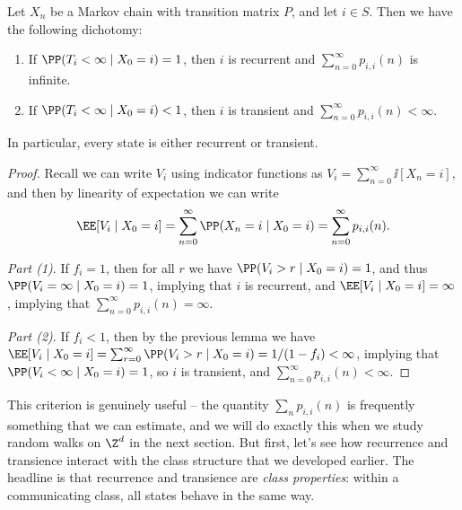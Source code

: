 \documentclass[a4paper]{scrartcl}
\begin{document}
\begin{theorem}
	Let $X_n$ be a Markov chain with transition matrix $P$, and let $i \in S$. Then we have the following dichotomy:
	\begin{enumerate}[label=(\arabic*)]
		\item If $\PP(T_i< \infty \mid X_0 = i) = 1$, then $i$ is recurrent and $\sum_{n = 0}^{\infty} p_{i, i}(n)$ is infinite.
		\item If $\PP(T_i < \infty \mid X_0 = i) < 1$, then $i$ is transient and $\sum_{n = 0}^{\infty} p_{i, i}(n) < \infty$.
	\end{enumerate}
	In particular, every state is either recurrent or transient.
\end{theorem}
\begin{proof}
	Recall we can write $V_i$ using indicator functions as
	$
	V_i = \sum_{n = 0}^{\infty} \ii[X_n = i],
	$
	and then by linearity of expectation we can write
	$$
	\EE[V_i \mid X_0 = i] = \sum_{n = 0}^{\infty} \PP(X_n = i \mid X_0 = i) = \sum_{n = 0}^{\infty} p_{i, i}(n).
	$$

	\emph{Part (1)}. If $f_i = 1$, then for all $r$ we have $\PP(V_i > r \mid X_0 = i) = 1$, and thus $\PP(V_i = \infty \mid X_0 = i) = 1$, implying that $i$ is recurrent, and $\EE[V_i \mid X_0 = i] = \infty$, implying that $\sum_{n = 0}^{\infty} p_{i, i}(n) = \infty$.

	\emph{Part (2)}. If $f_i < 1$, then by the previous lemma we have $\EE[V_i \mid X_0 = i] = \sum_{r = 0}^{\infty} \PP(V_i > r \mid X_0 = i) = 1/(1 - f_i) < \infty$, implying that $\PP(V_i < \infty \mid X_0 = i) = 1$, so $i$ is transient, and $\sum_{n = 0}^{\infty} p_{i, i}(n) < \infty$.
\end{proof}

This criterion is genuinely useful -- the quantity $\sum_n p_{i,i}(n)$ is frequently something that we can estimate, and we will do exactly this when we study random walks on $\Z^d$ in the next section. But first, let's see how recurrence and transience interact with the class structure that we developed earlier. The headline is that recurrence and transience are \emph{class properties}: within a communicating class, all states behave in the same way.
\end{document}
